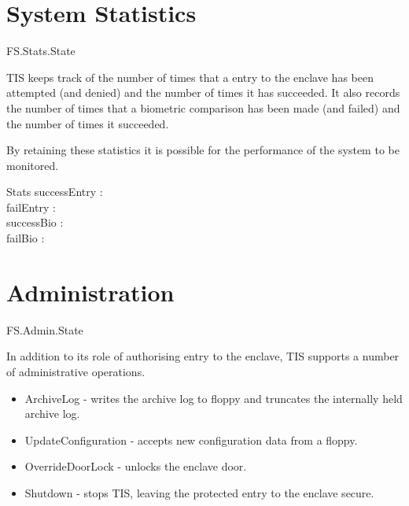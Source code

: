 \section{System Statistics}

\begin{traceunit}{FS.Stats.State}
\end{traceunit}


TIS keeps track of the number of times that a entry to the
enclave has been attempted (and denied) and the number of times it has succeeded. It
also records the number of times that a biometric comparison has been
made (and failed) and the number of times it succeeded.

By retaining these statistics it is possible for the performance of
the system to be monitored.

\begin{schema}{Stats} 
        successEntry : \nat
\\      failEntry : \nat
\\      successBio : \nat
\\      failBio : \nat
\end{schema}

\section{Administration}

\begin{traceunit}{FS.Admin.State}
\end{traceunit}

In addition to its role of authorising entry to the enclave, TIS 
supports a number of administrative operations. 

\begin{itemize}
\item ArchiveLog - writes the archive log to floppy and truncates the
internally held archive log.
\item UpdateConfiguration - accepts new configuration data from a floppy. 
\item OverrideDoorLock - unlocks the enclave door. 
\item Shutdown - stops TIS, leaving the protected entry to the enclave secure.
\end{itemize}

